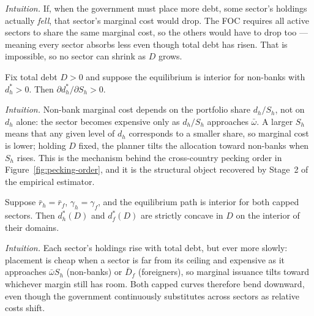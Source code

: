 \documentclass[\latexroot/\projectname]{subfiles}
\begin{document}
\noindent\emph{Intuition.} If, when the government must place more
debt, some sector's holdings actually \emph{fell}, that sector's
marginal cost would drop. The FOC requires all active sectors to
share the same marginal cost, so the others would have to drop too
--- meaning every sector absorbs less even though total debt has
risen. That is impossible, so no sector can shrink as $D$ grows.

\begin{proposition}
\label{prop:Sh}
Fix total debt $D>0$ and suppose the equilibrium is interior for
non-banks with $d_h^\ast>0$. Then
$\partial d_h^\ast/\partial S_h>0$.
\end{proposition}

\noindent\emph{Intuition.} Non-bank marginal cost depends on the
portfolio share $d_h/S_h$, not on $d_h$ alone: the sector becomes
expensive only as $d_h/S_h$ approaches $\bar\omega$. A larger $S_h$
means that any given level of $d_h$ corresponds to a smaller share,
so marginal cost is lower; holding $D$ fixed, the planner tilts the
allocation toward non-banks when $S_h$ rises. This is the mechanism
behind the cross-country pecking order in
Figure~\ref{fig:pecking-order}, and it is the structural object
recovered by Stage~2 of the empirical estimator.

\begin{proposition}
\label{prop:concave}
Suppose $\bar r_h=\bar r_f$, $\gamma_h=\gamma_f$, and the equilibrium
path is interior for both capped sectors. Then $d_h^\ast(D)$ and
$d_f^\ast(D)$ are strictly concave in $D$ on the interior of their
domains.
\end{proposition}

\noindent\emph{Intuition.} Each sector's holdings rise with total
debt, but ever more slowly: placement is cheap when a sector is far
from its ceiling and expensive as it approaches $\bar\omega S_h$
(non-banks) or $\bar D_f$ (foreigners), so marginal issuance tilts
toward whichever margin still has room. Both capped curves therefore
bend downward, even though the government continuously substitutes
across sectors as relative costs shift.
\end{document}
